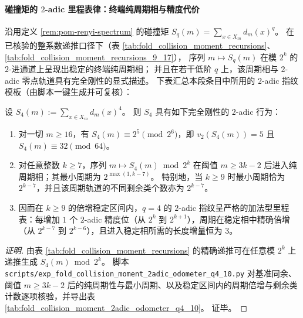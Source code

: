 
\paragraph{碰撞矩的 \(2\)-adic 里程表律：终端纯周期相与精度代价}\label{subsubsec:pom-collision-moment-2adic-odometer}
沿用定义 \ref{rem:pom-renyi-spectrum} 的碰撞矩 \(S_q(m)=\sum_{x\in X_m}d_m(x)^q\)。
在已核验的整系数递推口径下（表 \ref{tab:fold_collision_moment_recursions}、\ref{tab:fold_collision_moment_recursions_9_17}），
序列 \(m\mapsto S_q(m)\) 在模 \(2^k\) 的 \(2\)-进通道上呈现出稳定的终端纯周期相；
并且在若干低阶 \(q\) 上，该周期相与 \(2\)-adic 零点轨道具有完全刚性的显式描述。
下表汇总本段条目中所用的 \(2\)-adic 指纹模板（由脚本一键生成并可复核）：


\begin{conclusion}[\texorpdfstring{$q=4$}{q=4} 的 \(2\)-adic 里程表律：从常值模 \texorpdfstring{$2^6$}{64} 到精确倍增周期]\label{con:pom-s4-2adic-odometer}
设 \(S_4(m):=\sum_{x\in X_m} d_m(x)^4\)。
则 \(S_4\) 具有如下完全刚性的 \(2\)-adic 行为：
\begin{enumerate}
  \item 对一切 \(m\ge 16\)，有 \(S_4(m)\equiv 2^5\pmod{2^6}\)，即 \(v_2(S_4(m))=5\) 且 \(S_4(m)\equiv 32\pmod{64}\)。
  \item 对任意整数 \(k\ge 7\)，序列 \(m\mapsto S_4(m)\bmod 2^k\) 在阈值 \(m\ge 3k-2\) 后进入纯周期相；其最小周期为 \(2^{\max(1,k-7)}\)。
  特别地，当 \(k\ge 9\) 时最小周期恰为 \(2^{k-7}\)，并且该周期轨道的不同剩余类个数亦为 \(2^{k-7}\)。
  \item 因而在 \(k\ge 9\) 的倍增稳定区间内，\(q=4\) 的 \(2\)-adic 指纹呈严格的加法型里程表：每增加 \(1\) 个 \(2\)-adic 精度位（从 \(2^k\) 到 \(2^{k+1}\)），周期在稳定相中精确倍增（从 \(2^{k-7}\) 到 \(2^{k-6}\)），且进入稳定相所需的长度增量恒为 \(3\)。
\end{enumerate}
\end{conclusion}
\begin{proof}[证明]
由表 \ref{tab:fold_collision_moment_recursions} 的精确递推可在任意模 \(2^k\) 上递推生成 \(S_4(m)\bmod 2^k\)。
脚本 \texttt{scripts/exp\_fold\_collision\_moment\_2adic\_odometer\_q4\_10.py} 对基准同余、阈值 \(m\ge 3k-2\) 后的纯周期性与最小周期、以及稳定区间内的周期倍增与剩余类计数逐项核验，并导出表 \ref{tab:fold_collision_moment_2adic_odometer_q4_10}。
证毕。
\end{proof}

